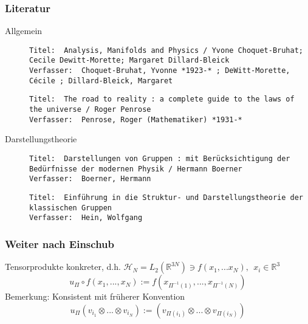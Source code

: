 \documentclass[twoside,a4paper]{scrartcl}
\renewcommand{\1}{\mathds{1}}
\begin{document}
\subsubsection*{Literatur}
\begin{description}
 \item[Allgemein]
\begin{tiny}
\begin{verbatim}
Titel: 	Analysis, Manifolds and Physics / Yvone Choquet-Bruhat; Cecile Dewitt-Morette; Margaret Dillard-Bleick
Verfasser: 	Choquet-Bruhat, Yvonne *1923-* ; DeWitt-Morette, Cécile ; Dillard-Bleick, Margaret
\end{verbatim}
\end{tiny}

\begin{tiny}
\begin{verbatim}
Titel:	The road to reality : a complete guide to the laws of the universe / Roger Penrose
Verfasser:	Penrose, Roger (Mathematiker) *1931-*
\end{verbatim}
\end{tiny} 
\item[Darstellungstheorie]
\begin{tiny}
\begin{verbatim}
Titel: 	Darstellungen von Gruppen : mit Berücksichtigung der Bedürfnisse der modernen Physik / Hermann Boerner
Verfasser: 	Boerner, Hermann
\end{verbatim}
\end{tiny}



\begin{tiny}
\begin{verbatim}
Titel: 	Einführung in die Struktur- und Darstellungstheorie der klassischen Gruppen 
Verfasser: 	Hein, Wolfgang
\end{verbatim}
\end{tiny}

 \end{description}

\subsubsection*{Weiter nach Einschub}
Tensorprodukte konkreter, d.h. $\mathcal H_N=L_2(\mathbb R^{3N}) \ni f(x_1,...x_N), \ \ x_i \in \mathbb R^3$
$$u_\Pi \circ f(x_1,...,x_N):=f(x_{\Pi^{-1}(1)},...,x_{\Pi^{-1}(N)})$$
Bemerkung: Konsistent mit früherer Konvention
$$u_\Pi (v_{i_1}\otimes ... \otimes v_{i_N}):=(v_{\Pi(i_1)}\otimes ... \otimes v_{\Pi(i_N)}) $$
\end{document}
